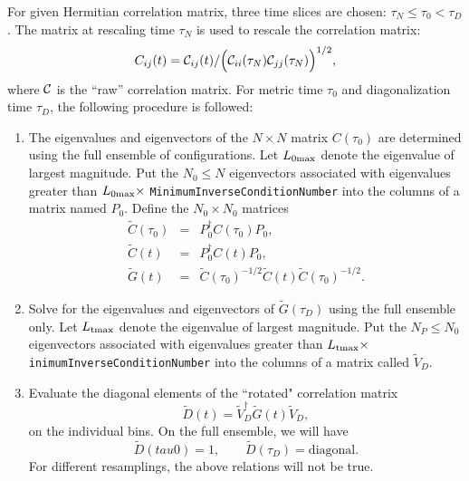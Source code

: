 \documentclass[12pt]{article}
\newcommand{\vb}{\texttt}
\begin{document}
For given Hermitian correlation matrix, three time slices are chosen:         
$\tau_N \leq \tau_0 < \tau_D$.  The matrix at rescaling time $\tau_N$ is used to
rescale the correlation matrix:                                                       
\[
      C_{ij}(t) = {\cal C}_{ij}(t) / \Bigl(  {\cal C}_{ii}(\tau_N) {\cal C}_{jj}(\tau_N) \Bigr)^{1/2},        
\]
where ${\cal C}$ is the ``raw'' correlation matrix.                                                                               
For metric time $\tau_0$ and diagonalization time $\tau_D$, the following         
procedure is followed:                                                        
\begin{enumerate}
\item
    The eigenvalues and eigenvectors of the $N\times N$ matrix $C(\tau_0)$ are            
       determined using the full ensemble of configurations.  Let $L_{0{\rm  max}}$        
       denote the eigenvalue of largest magnitude.  Put the $N_0 \leq N$ eigenvectors 
       associated with eigenvalues greater than                                  
       $L_{0{\rm max}} \times$  \vb{MinimumInverseConditionNumber} into the columns of a matrix    
       named $P_0$.  Define the $N_0 \times N_0$ matrices 
       \begin{eqnarray*}                                 
          \tilde{C}(\tau_0) &=& P_0^\dagger C(\tau_0) P_0,\\                                       
          \tilde{C}(t) &=& P_0^\dagger C(t) P_0         ,\\                                    
          \tilde{G}(t) &=& \tilde{C}(\tau_0)^{-1/2} \tilde{C}(t) \tilde{C}(\tau_0)^{-1/2}.
       \end{eqnarray*}          
\item                                   
    Solve for the eigenvalues and eigenvectors of $\tilde{G}(\tau_D)$ using the      
       full ensemble only.  Let $L_{\rm tmax}$ denote the eigenvalue of largest         
       magnitude.  Put the $N_P \leq N_0$ eigenvectors associated with eigenvalues     
       greater than $L_{\rm tmax} \times$ \vb{inimumInverseConditionNumber} into the columns   
       of a matrix called $\tilde{V}_D$.                                               
\item                                                                                 
   Evaluate the diagonal elements of the ``rotated" correlation matrix
    \[        
          \tilde{D}(t) = \tilde{V}_D^\dagger \tilde{G}(t) \tilde{V}_D,
    \]                             
       on the individual bins.  On the full ensemble, we will have               
    \[       \tilde{D}(tau0) = 1,\qquad  \tilde{D}(\tau_D) = \mbox{diagonal}.\]                           
       For different resamplings, the above relations will not be true.          
\end{enumerate}                                                                            
\end{document}
